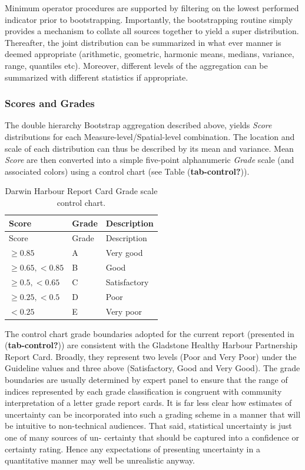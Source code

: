 \documentclass[
  8pt,
  a4paper]{article}
\begin{document}
Minimum operator procedures are supported by filtering on the lowest
performed indicator prior to bootstrapping. Importantly, the
bootstrapping routine simply provides a mechanism to collate all sources
together to yield a super distribution. Thereafter, the joint
distribution can be summarized in what ever manner is deemed appropriate
(arithmetic, geometric, harmonic means, medians, variance, range,
quantiles etc). Moreover, different levels of the aggregation can be
summarized with different statistics if appropriate.

\subsubsection{Scores and Grades}\label{scores-and-grades}

The double hierarchy Bootstrap aggregation described above, yields
\emph{Score} distributions for each Measure-level/Spatial-level
combination. The location and scale of each distribution can thus be
described by its mean and variance. Mean \emph{Score} are then converted
into a simple five-point alphanumeric \emph{Grade} scale (and associated
colors) using a control chart (see Table (\textbf{tab-control?})).

\begin{longtable}[]{@{}lll@{}}
\caption{Darwin Harbour Report Card Grade scale control
chart.}\tabularnewline
\toprule\noalign{}
Score & Grade & Description \\
\midrule\noalign{}
\endfirsthead
\toprule\noalign{}
Score & Grade & Description \\
\midrule\noalign{}
\endhead
\bottomrule\noalign{}
\endlastfoot
\(\ge 0.85\) & A & Very good \\
\(\ge 0.65, <0.85\) & B & Good \\
\(\ge 0.5, <0.65\) & C & Satisfactory \\
\(\ge 0.25, <0.5\) & D & Poor \\
\(<0.25\) & E & Very poor \\
\end{longtable}

The control chart grade boundaries adopted for the current report
(presented in (\textbf{tab-control?})) are consistent with the Gladstone
Healthy Harbour Partnership Report Card. Broadly, they represent two
levels (Poor and Very Poor) under the Guideline values and three above
(Satisfactory, Good and Very Good). The grade boundaries are usually
determined by expert panel to ensure that the range of indices
represented by each grade classification is congruent with community
interpretation of a letter grade report cards. It is far less clear how
estimates of uncertainty can be incorporated into such a grading scheme
in a manner that will be intuitive to non-technical audiences. That
said, statistical uncertainty is just one of many sources of un-
certainty that should be captured into a confidence or certainty rating.
Hence any expectations of presenting uncertainty in a quantitative
manner may well be unrealistic anyway.
\end{document}
